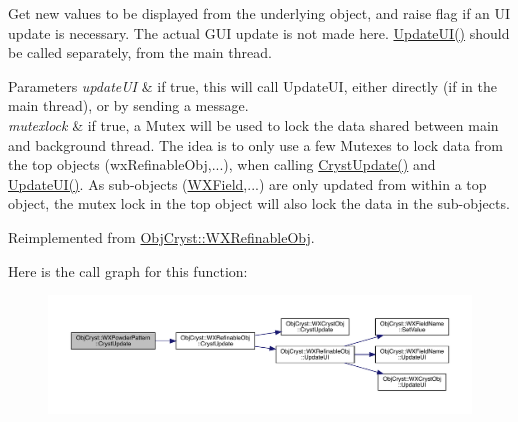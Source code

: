 Get new values to be displayed from the underlying object, and raise flag if an UI update is necessary. The actual G\+UI update is not made here. \mbox{\hyperlink{class_obj_cryst_1_1_w_x_powder_pattern_aaeace05033eaea9499398825fc8244da}{Update\+U\+I()}} should be called separately, from the main thread.


\begin{DoxyParams}{Parameters}
{\em update\+UI} & if true, this will call Update\+UI, either directly (if in the main thread), or by sending a message. \\
\hline
{\em mutexlock} & if true, a Mutex will be used to lock the data shared between main and background thread. The idea is to only use a few Mutexes to lock data from the top objects (wx\+Refinable\+Obj,...), when calling \mbox{\hyperlink{class_obj_cryst_1_1_w_x_powder_pattern_a8bdd59548c11c11a53197c0679c258a8}{Cryst\+Update()}} and \mbox{\hyperlink{class_obj_cryst_1_1_w_x_powder_pattern_aaeace05033eaea9499398825fc8244da}{Update\+U\+I()}}. As sub-\/objects (\mbox{\hyperlink{class_obj_cryst_1_1_w_x_field}{W\+X\+Field}},...) are only updated from within a top object, the mutex lock in the top object will also lock the data in the sub-\/objects. \\
\hline
\end{DoxyParams}


Reimplemented from \mbox{\hyperlink{class_obj_cryst_1_1_w_x_refinable_obj_a8249d288e62ad1ebffeea91f77ae37a3}{Obj\+Cryst\+::\+W\+X\+Refinable\+Obj}}.

Here is the call graph for this function\+:
\nopagebreak
\begin{figure}[H]
\begin{center}
\leavevmode
\includegraphics[width=350pt]{class_obj_cryst_1_1_w_x_powder_pattern_a8bdd59548c11c11a53197c0679c258a8_cgraph}
\end{center}
\end{figure}
\mbox{\label{class_obj_cryst_1_1_w_x_powder_pattern_aaeace05033eaea9499398825fc8244da}} 
